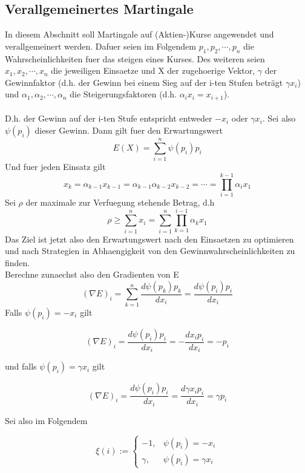 \documentclass[11pt]{scrartcl}
\begin{document}
		\subsection{Verallgemeinertes Martingale}
			In diesem Abschnitt soll Martingale auf (Aktien-)Kurse angewendet und verallgemeinert werden. Dafuer seien im Folgendem \(p_{1}, p_{2}, \cdots,p_{n}\) die Wahrscheinlichkeiten fuer das steigen eines Kurses. Des weiteren seien \(x_{1}, x_{2}, \cdots,x_{n}\) die jeweiligen Einsaetze und X der zugehoerige Vektor, \(\gamma\) der Gewinnfaktor (d.h. der Gewinn bei einem Sieg auf der i-ten Stufen beträgt \(\gamma x_{i}\)) und \(\alpha_{1}, \alpha_{2}, \cdots,\alpha_{n}\) die Steigerungsfaktoren (d.h. \(\alpha_{i}x_{i}=x_{i+1}\)).\\\\
			D.h. der Gewinn auf der i-ten Stufe entspricht entweder \(-x_{i}\) oder \(\gamma x_{i}\). Sei also \(\psi(p_{i})\) dieser Gewinn. Dann gilt fuer den Erwartungswert
			$$
				E(X)=\sum_{i=1}^n \psi(p_{i})p_{i}
			$$
			Und fuer jeden Einsatz gilt
			$$
				x_{k}=\alpha_{k-1}x_{k-1}=\alpha_{k-1}\alpha_{k-2}x_{k-2}=\cdots=\prod_{i=1}^{k-1}\alpha_{i}x_{1}
			$$
			Sei \(\rho\) der maximale zur Verfuegung stehende Betrag, d.h
			$$
				\rho \geq \sum_{i=1}^{n}x_{i}=\sum_{i=1}^{n}\prod_{k=1}^{i-1}\alpha_{k}x_{1}
			$$
			Das Ziel ist jetzt also den Erwartungswert nach den Einsaetzen zu optimieren und nach Strategien in Abhaengigkeit von den Gewinnwahrscheinlichkeiten zu finden.\\
			Berechne zunaechst also den Gradienten von E
			$$
				(\nabla E)_{i}=\sum_{k=1}^{n}\frac{d\psi(p_{k})p_{k}}{dx_{i}}=\frac{d\psi(p_{i})p_{i}}{dx_{i}}
			$$
			Falls \(\psi(p_{i})=-x_{i}\) gilt
			\begin{center}
				\[(\nabla E)_{i}=\frac{d\psi(p_{i})p_{i}}{dx_{i}}=-\frac{dx_{i}p_{i}}{dx_{i}}=-p_{i}\]
			\end{center}
			und falls \(\psi(p_{i})=\gamma x_{i}\) gilt
			\begin{center}
				\[(\nabla E)_{i}=\frac{d\psi(p_{i})p_{i}}{dx_{i}}=\frac{d\gamma x_{i}p_{i}}{dx_{i}}=\gamma p_{i}\]
			\end{center}
			Sei also im Folgendem
			\begin{center}
				\[ \xi(i) :=
					\begin{cases}
						-1, & \psi(p_{i})=-x_{i} \\
						\gamma, & \psi(p_{i})=\gamma x_{i}
					\end{cases}
				\]
			\end{center}
\end{document}

